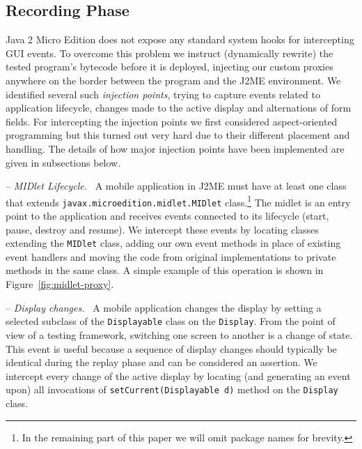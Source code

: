\documentclass{llncs}
\newcommand{\internalsection}[1]{\par\medskip\noindent-- \emph{#1}~}
\newcommand{\customtextsc}[1]{{\scriptsize \MakeUppercase{#1}}}
\newcommand{\acro}[1]{\customtextsc{#1}}   %
\newcommand{\gui}{\acro{gui}}              %
\newcommand{\jme}{\acro{j2me}}             %
\newcommand{\method}[1]{\texttt{#1}}       %
\newcommand{\class}[1]{\texttt{#1}}        %
\begin{document}
\subsection{Recording Phase} %

Java 2 Micro Edition does not expose any standard system hooks for intercepting \gui{} events. To
overcome this problem we instruct (dynamically rewrite) the tested program's bytecode before it is
deployed, injecting our custom proxies anywhere on the border between the program and the \jme{}
environment. We identified several such \emph{injection points}, trying to capture events related to
application lifecycle, changes made to the active display and alternations of form fields. 
For intercepting the injection points we first considered aspect-oriented programming but this turned
out very hard due to their different placement and handling. The details of how major injection points 
have been implemented are given in subsections below.

\internalsection{MIDlet Lifecycle.} A mobile application in \jme{} must have at least one class that
extends \texttt{javax.\-microedition.\-midlet.\-MIDlet} class.\footnote{In the remaining part of
this paper we will omit package names for brevity.} The midlet is an entry point to the application
and receives events connected to its lifecycle (start, pause, destroy and resume). We intercept
these events by locating classes extending the \texttt{MIDlet} class, adding our own event methods
in place of existing event handlers and moving the code from original implementations to private
methods in the same class. A simple example of this operation is shown in Figure~\vref{fig:midlet-proxy}.



\internalsection{Display changes.} A mobile application changes the display by setting a selected
subclass of the \class{Displayable} class on the \class{Display}. From the point of view of a testing
framework, switching one screen to another is a change of state. This event is useful because a
sequence of display changes should typically be identical during the replay phase and can be
considered an assertion. We intercept every change of the active display by locating (and generating
an event upon) all invocations of \method{setCurrent(Displayable d)} method on the \class{Display}
class.
\end{document}
